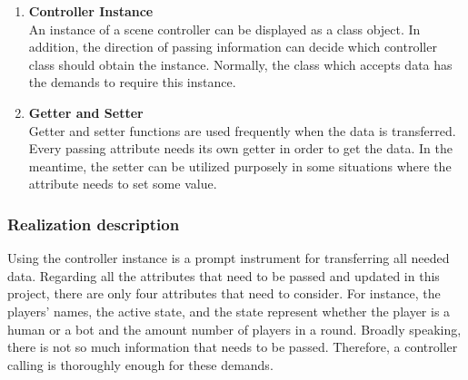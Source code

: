 \begin{enumerate}
	\item\textbf{Controller Instance }\\
    An instance of a scene controller can be displayed as a class object. In addition, the direction of passing information can decide which controller class should obtain the instance. Normally, the class which accepts data has the demands to require this instance. 
   
    \item\textbf{Getter and Setter }\\
     Getter and setter functions are used frequently when the data is transferred. Every passing attribute needs its own getter in order to get the data. In the meantime, the setter can be utilized purposely in some situations where the attribute needs to set some value.    
     

\end{enumerate}

\subsubsection{Realization description}
Using the controller instance is a prompt instrument for transferring all needed data. Regarding all the attributes that need to be passed and updated in this project, there are only four attributes that need to consider. For instance, the players' names, the active state, and the state represent whether the player is a human or a bot and the amount number of players in a round. Broadly speaking, there is not so much information that needs to be passed. Therefore, a controller calling is thoroughly enough for these demands.
